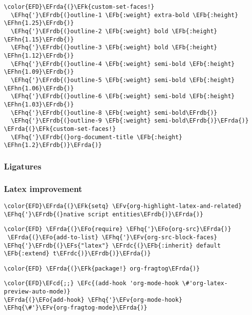 \documentclass[12pt]{article}
\theoremstyle{plain}%
\theoremstyle{definition}
\theoremstyle{remark}
\newcommand{\EFc}[1]{\textcolor{EFc}{#1}} %
\newcommand{\EFcd}[1]{\textcolor{EFcd}{#1}} %
\newcommand{\EFs}[1]{\textcolor{EFs}{#1}} %
\newcommand{\EFk}[1]{\textcolor{EFk}{#1}} %
\newcommand{\EFb}[1]{\textcolor{EFb}{#1}} %
\newcommand{\EFv}[1]{\textcolor{EFv}{#1}} %
\newcommand{\EFo}[1]{\textcolor{EFo}{#1}} %
\newcommand{\EFhn}[1]{\textcolor{EFhn}{\textbf{#1}}} %
\newcommand{\EFhq}[1]{\textcolor{EFhq}{#1}} %
\newcommand{\EFrda}[1]{\textcolor{EFrda}{#1}} %
\newcommand{\EFrdb}[1]{\textcolor{EFrdb}{#1}} %
\newcommand{\EFrdc}[1]{\textcolor{EFrdc}{#1}} %
\begin{document}
\begin{Code}
\begin{Verbatim}
\color{EFD}\EFrda{(}\EFk{custom-set-faces!}
  \EFhq{'}\EFrdb{(}outline-1 \EFb{:weight} extra-bold \EFb{:height} \EFhn{1.25}\EFrdb{)}
  \EFhq{'}\EFrdb{(}outline-2 \EFb{:weight} bold \EFb{:height} \EFhn{1.15}\EFrdb{)}
  \EFhq{'}\EFrdb{(}outline-3 \EFb{:weight} bold \EFb{:height} \EFhn{1.12}\EFrdb{)}
  \EFhq{'}\EFrdb{(}outline-4 \EFb{:weight} semi-bold \EFb{:height} \EFhn{1.09}\EFrdb{)}
  \EFhq{'}\EFrdb{(}outline-5 \EFb{:weight} semi-bold \EFb{:height} \EFhn{1.06}\EFrdb{)}
  \EFhq{'}\EFrdb{(}outline-6 \EFb{:weight} semi-bold \EFb{:height} \EFhn{1.03}\EFrdb{)}
  \EFhq{'}\EFrdb{(}outline-8 \EFb{:weight} semi-bold\EFrdb{)}
  \EFhq{'}\EFrdb{(}outline-9 \EFb{:weight} semi-bold\EFrdb{)}\EFrda{)}
\EFrda{(}\EFk{custom-set-faces!}
  \EFhq{'}\EFrdb{(}org-document-title \EFb{:height} \EFhn{1.2}\EFrdb{)}\EFrda{)}
\end{Verbatim}
\end{Code}

\subsubsection{Ligatures}
\label{sec:orgb021125}
\subsubsection{Latex improvement}
\label{sec:org958c5ba}
\begin{Code}
\begin{Verbatim}
\color{EFD}\EFrda{(}\EFk{setq} \EFv{org-highlight-latex-and-related} \EFhq{'}\EFrdb{(}native script entities\EFrdb{)}\EFrda{)}
\end{Verbatim}
\end{Code}
\begin{Code}
\begin{Verbatim}
\color{EFD} \EFrda{(}\EFo{require} \EFhq{'}\EFo{org-src}\EFrda{)}
 \EFrda{(}\EFo{add-to-list} \EFhq{'}\EFv{org-src-block-faces} \EFhq{'}\EFrdb{(}\EFs{"latex"} \EFrdc{(}\EFb{:inherit} default \EFb{:extend} t\EFrdc{)}\EFrdb{)}\EFrda{)}
\end{Verbatim}
\end{Code}
\begin{Code}
\begin{Verbatim}
\color{EFD} \EFrda{(}\EFk{package!} org-fragtog\EFrda{)}
\end{Verbatim}
\end{Code}
\begin{Code}
\begin{Verbatim}
\color{EFD}\EFcd{;;} \EFc{(add-hook 'org-mode-hook \#'org-latex-preview-auto-mode)}
\EFrda{(}\EFo{add-hook} \EFhq{'}\EFv{org-mode-hook} \EFhq{\#'}\EFv{org-fragtog-mode}\EFrda{)}
\end{Verbatim}
\end{Code}
\end{document}
